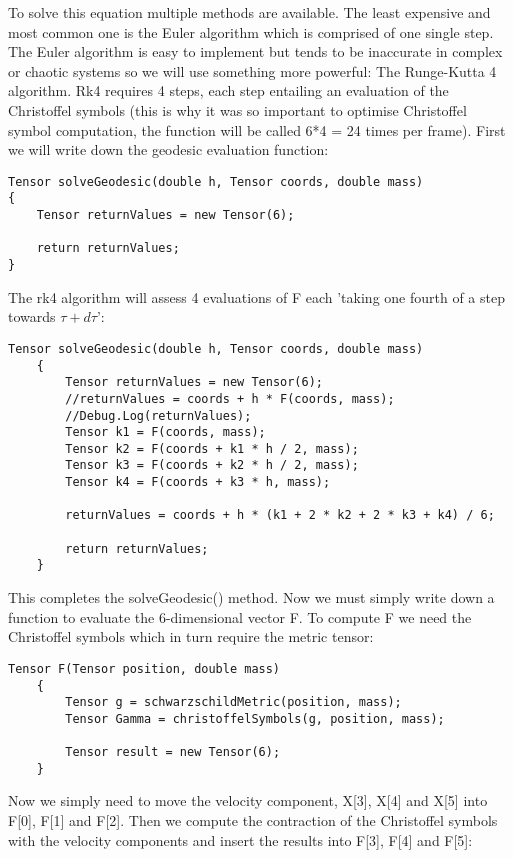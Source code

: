 \documentclass{article}
\begin{document}
To solve this equation multiple methods are available. The least expensive and most common one is the Euler algorithm which is comprised of one single step. The Euler algorithm is easy to implement but tends to be inaccurate in complex or chaotic systems so we will use something more powerful: The Runge-Kutta 4 algorithm. Rk4 requires 4 steps, each step entailing an evaluation of the Christoffel symbols (this is why it was so important to optimise Christoffel symbol computation, the function will be called 6*4 = 24 times per frame). First we will write down the geodesic evaluation function:

\begin{verbatim}
Tensor solveGeodesic(double h, Tensor coords, double mass)
{
    Tensor returnValues = new Tensor(6);

    return returnValues;
}
\end{verbatim}

The rk4 algorithm will assess 4 evaluations of F each 'taking one fourth of a step towards $\tau + d\tau$':

\begin{verbatim}
Tensor solveGeodesic(double h, Tensor coords, double mass)
    {
        Tensor returnValues = new Tensor(6);
        //returnValues = coords + h * F(coords, mass);
        //Debug.Log(returnValues);
        Tensor k1 = F(coords, mass);
        Tensor k2 = F(coords + k1 * h / 2, mass);
        Tensor k3 = F(coords + k2 * h / 2, mass);
        Tensor k4 = F(coords + k3 * h, mass);

        returnValues = coords + h * (k1 + 2 * k2 + 2 * k3 + k4) / 6;

        return returnValues;
    }
\end{verbatim}

This completes the solveGeodesic() method. Now we must simply write down a function to evaluate the 6-dimensional vector F. To compute F we need the Christoffel symbols which in turn require the metric tensor:

\begin{verbatim}
Tensor F(Tensor position, double mass)
    {
        Tensor g = schwarzschildMetric(position, mass);
        Tensor Gamma = christoffelSymbols(g, position, mass);

        Tensor result = new Tensor(6);
    }
\end{verbatim}

\newpage
Now we simply need to move the velocity component, X[3], X[4] and X[5] into F[0], F[1] and F[2]. Then we compute the contraction of the Christoffel symbols with the velocity components and insert the results into F[3], F[4] and F[5]:
\end{document}
